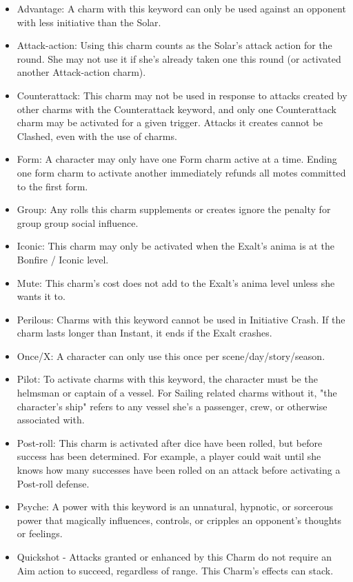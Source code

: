 \documentclass[oneside]{book}
\begin{document}
\begin{multicols}{2}
\begin{itemize}
  \item Advantage: A charm with this keyword can only be used against an opponent with less initiative than the Solar.
  \item Attack-action: Using this charm counts as the Solar's attack action for the round. She may not use it if she's already taken one this round (or activated another Attack-action charm).
  \item Counterattack: This charm may not be used in response to attacks created by other charms with the Counterattack keyword, and only one Counterattack charm may be activated for a given trigger. Attacks it creates cannot be Clashed, even with the use of charms.
  \item Form: A character may only have one Form charm active at a time. Ending one form charm to activate another immediately refunds all motes committed to the first form.
  \item Group: Any rolls this charm supplements or creates ignore the penalty for group group social influence.
  \item Iconic: This charm may only be activated when the Exalt's anima is at the Bonfire / Iconic level.
  \item Mute: This charm's cost does not add to the Exalt's anima level unless she wants it to.
  \item Perilous: Charms with this keyword cannot be used in Initiative Crash. If the charm lasts longer than Instant, it ends if the Exalt crashes.
  \item Once/X: A character can only use this once per scene/day/story/season.
  \item Pilot: To activate charms with this keyword, the character must be the helmsman or captain of a vessel. For Sailing related charms without it, "the character's ship" refers to any vessel she's a passenger, crew, or otherwise associated with.
  \item Post-roll: This charm is activated after dice have been rolled, but before success has been determined. For example, a player could wait until she knows how many successes have been rolled on an attack before activating a Post-roll defense.
  \item Psyche: A power with this keyword is an unnatural, hypnotic, or sorcerous power that magically influences, controls, or cripples an opponent's thoughts or feelings.
  \item Quickshot - Attacks granted or enhanced by this Charm do not require an Aim action to succeed, regardless of range.
    This Charm's effects can stack.
\end{itemize}

\end{multicols}
\end{document}
